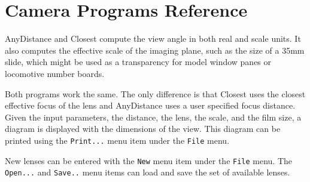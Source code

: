 

\chapter{Camera Programs Reference}
\label{chpt:camera:Reference}

AnyDistance and Closest compute the view angle in both real and scale
units. It also computes the effective scale of the imaging plane, such
as the size of a 35mm slide, which might be used as a transparency for
model window panes or locomotive number boards.

Both programs work the same. The only difference is that Closest uses
the closest effective focus of the lens and AnyDistance uses a user
specified focus distance.  Given the input parameters, the distance,
the lens, the scale, and the film size, a diagram is displayed with the
dimensions of the view.  This diagram can be printed using the \verb=Print...=
menu item under the \verb=File= menu.

New lenses can be entered with the \verb=New= menu item under the
\verb=File= menu. The \verb=Open...= and \verb=Save..= menu items can
load and save the set of available lenses.

